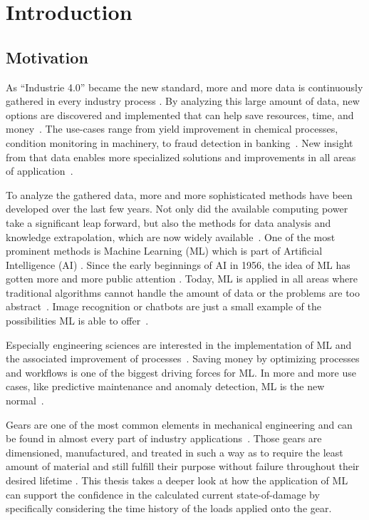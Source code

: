 \chapter{Introduction}
\section{Motivation}\label{intro}
As “Industrie 4.0” became the new standard, more and more data is continuously gathered in every industry process \cite{Vogel}. By analyzing this large amount of data, new options are discovered and implemented that can help save resources, time, and money~\cite{Theodoridis}. The use-cases range from yield improvement in chemical processes, condition monitoring in machinery, to fraud detection in banking~\cite{Janiesch}. New insight from that data enables more specialized solutions and improvements in all areas of application~\cite{Russell}. 

To analyze the gathered data, more and more sophisticated methods have been developed over the last few years. Not only did the available computing power take a significant leap forward, but also the methods for data analysis and knowledge extrapolation, which are now widely available~\cite{Janiesch}. One of the most prominent methods is Machine Learning (ML) which is part of Artificial Intelligence (AI) \cite{Helm}. Since the early beginnings of AI in 1956, the idea of ML has gotten more and more public attention \cite{Russell}. Today, ML is applied in all areas where traditional algorithms cannot handle the amount of data or the problems are too abstract~\cite{Carleo}. Image recognition or chatbots are just a small example of the possibilities ML is able to offer~\cite{Theodoridis}.

Especially engineering sciences are interested in the implementation of ML and the associated improvement of processes~\cite{Carleo}. Saving money by optimizing processes and workflows is one of the biggest driving forces for ML. In more and more use cases, like predictive maintenance and anomaly detection, ML is the new normal~\cite{Theodoridis}.

Gears are one of the most common elements in mechanical engineering and can be found in almost every part of industry applications~\cite{Vullo}. Those gears are dimensioned, manufactured, and treated in such a way as to require the least amount of material and still fulfill their purpose without failure throughout their desired lifetime \cite{Bugliarello}. This thesis takes a deeper look at how the application of ML can support the confidence in the calculated current state-of-damage by specifically considering the time history of the loads applied onto the gear.
